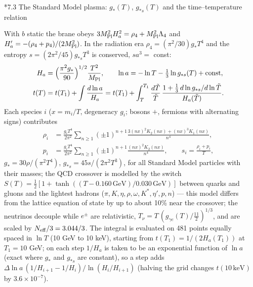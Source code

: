 \documentclass[10pt,a4paper]{article}
\makeatletter
\renewcommand\subsection{\@startsection{subsection}{2}{\z@}{-3.25ex\@plus -1ex \@minus -.2ex}{1.5ex \@plus .2ex}{\normalfont\large\bfseries\raggedright}}
\makeatother
\begin{document}
\subsection*{7.3 The Standard Model plasma: \texorpdfstring{$g_*(T)$}{g*(T)}, \texorpdfstring{$g_{*s}(T)$}{g*s(T)} and the time–temperature relation}
With $b$ static the brane obeys $3M_{\rm Pl}^2H_a^2=\rho_4+M_{\rm Pl}^2\Lambda_4$ and $H_a'=-(\rho_4+p_4)/(2M_{\rm Pl}^2)$. In the radiation era $\rho_4=(\pi^2/30)g_*T^4$ and the entropy $s=(2\pi^2/45)g_{*s}T^3$ is conserved, $sa^3=$ const:
\begin{align*}
H_a&=\Big(\frac{\pi^2g_*}{90}\Big)^{1/2}\frac{T^2}{M_{\rm Pl}},\qquad \ln a=-\ln T-\tfrac13\ln g_{*s}(T)+\text{const}, \\
t(T)&=t(T_1)+\int\frac{d\ln a}{H_a}=t(T_1)+\int_T^{T_1}\frac{d\tilde T}{\tilde T}\,\frac{1+\frac13\,d\ln g_{*s}/d\ln\tilde T}{H_a(\tilde T)}.
\end{align*}
Each species $i$ ($x=m_i/T$, degeneracy $g_i$; bosons $+$, fermions with alternating signs) contributes
\begin{align*}
\rho_i&=\frac{g_iT^4}{2\pi^2}\sum_{n\ge1}(\pm1)^{n+1}\frac{3(nx)^2K_2(nx)+(nx)^3K_1(nx)}{n^4}, \\
p_i&=\frac{g_iT^4}{2\pi^2}\sum_{n\ge1}(\pm1)^{n+1}\frac{(nx)^2K_2(nx)}{n^4},\qquad s_i=\frac{\rho_i+p_i}T,
\end{align*}
$g_*=30\rho/(\pi^2T^4)$, $g_{*s}=45s/(2\pi^2T^3)$, for all Standard Model particles with their masses; the QCD crossover is modelled by the switch $S(T)=\tfrac12[1+\tanh((T-0.160\,\mathrm{GeV})/0.030\,\mathrm{GeV})]$ between quarks and gluons and the lightest hadrons ($\pi,K,\eta,\rho,\omega,K^*,\eta',p,n$) — this model differs from the lattice equation of state by up to about 10\% near the crossover; the neutrinos decouple while $e^\pm$ are relativistic, $T_\nu=T\,(g_{\gamma e}(T)/\tfrac{11}2)^{1/3}$, and are scaled by $N_{\rm eff}/3=3.044/3$. The integral is evaluated on 481 points equally spaced in $\ln T$ (10 GeV to 10 keV), starting from $t(T_1)=1/(2H_a(T_1))$ at $T_1=10$ GeV; on each step $1/H_a$ is taken to be an exponential function of $\ln a$ (exact where $g_*$ and $g_{*s}$ are constant), so a step adds $\Delta\ln a\,(1/H_{i+1}-1/H_i)/\ln(H_i/H_{i+1})$ (halving the grid changes $t(10\,\mathrm{keV})$ by $3.6\times10^{-7}$).
\end{document}
